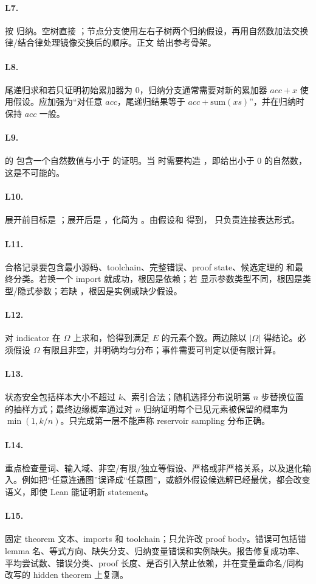 \paragraph{L7.}
按  归纳。空树直接 ；节点分支使用左右子树两个归纳假设，再用自然数加法交换律/结合律处理镜像交换后的顺序。正文  给出参考骨架。

\paragraph{L8.}
尾递归求和若只证明初始累加器为 0，归纳分支通常需要对新的累加器 $acc+x$ 使用假设。应加强为“对任意 $acc$，尾递归结果等于 $acc+\mathrm{sum}(xs)$”，并在归纳时保持 $acc$ 一般。

\paragraph{L9.}
 的  包含一个自然数值与小于  的证明。当  时需要构造 ，即给出小于 0 的自然数，这是不可能的。

\paragraph{L10.}
展开前目标是 ；展开后是 ，化简为 。由假设和  得到， 只负责连接表达形式。

\paragraph{L11.}
合格记录要包含最小源码、toolchain、完整错误、proof state、候选定理的  和最终分类。若换一个 import 就成功，根因是依赖；若  显示参数类型不同，根因是类型/隐式参数；若缺 ，根因是实例或缺少假设。

\paragraph{L12.}
对 indicator 在 $\Omega$ 上求和，恰得到满足 $E$ 的元素个数。两边除以 $|\Omega|$ 得结论。必须假设 $\Omega$ 有限且非空，并明确均匀分布；事件需要可判定以便有限计算。

\paragraph{L13.}
状态安全包括样本大小不超过 $k$、索引合法；随机选择分布说明第 $n$ 步替换位置的抽样方式；最终边缘概率通过对 $n$ 归纳证明每个已见元素被保留的概率为 $\min(1,k/n)$。只完成第一层不能声称 reservoir sampling 分布正确。

\paragraph{L14.}
重点检查量词、输入域、非空/有限/独立等假设、严格或非严格关系，以及退化输入。例如把“任意连通图”误译成“任意图”，或额外假设候选解已经最优，都会改变语义，即使 Lean 能证明新 statement。

\paragraph{L15.}
固定 theorem 文本、imports 和 toolchain；只允许改 proof body。错误可包括错 lemma 名、等式方向、缺失分支、归纳变量错误和实例缺失。报告修复成功率、平均尝试数、错误分类、proof 长度、是否引入禁止依赖，并在变量重命名/同构改写的 hidden theorem 上复测。
